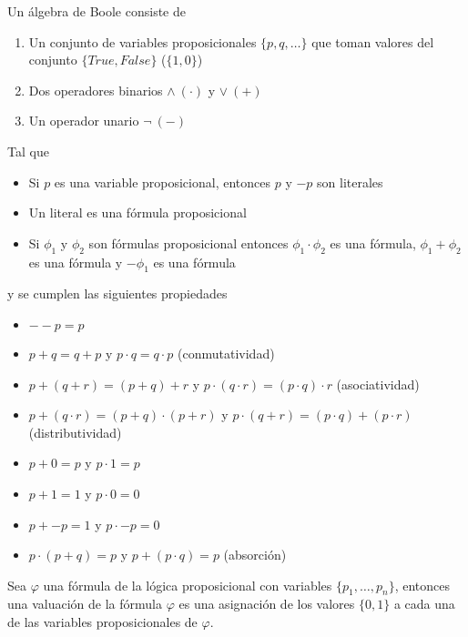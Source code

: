 \begin{definition}
 Un álgebra de Boole consiste de 
	\begin{enumerate}
		\item Un conjunto de variables proposicionales $\{p, q, \ldots\}$ que toman valores del conjunto $\{True, False\}$ ($\{1, 0\}$)
		\item Dos operadores binarios $\wedge\ (\cdot)$  y $\vee\ (+)$
		\item Un operador unario $\neg\ (-)$
	\end{enumerate}
	Tal que 
	\begin{itemize}
		\item Si $p$ es una variable proposicional, entonces $p$ y $-p$ son literales
		\item Un literal es una fórmula proposicional
		\item Si $\phi_1$ y $\phi_2$ son fórmulas proposicional entonces $\phi_1 \cdot \phi_2$ es una fórmula, $\phi_1 + \phi_2$ es una fórmula y $-\phi_1$ es una fórmula
	\end{itemize}
	y se cumplen las siguientes propiedades
	\begin{itemize}
		\item $--p = p$
		\item $p + q = q + p$ y $p \cdot q = q \cdot p$ (conmutatividad)
		\item $p + (q + r) = (p + q) + r$ y $p \cdot (q \cdot r) = (p \cdot q) \cdot r$ (asociatividad)
		\item $p + (q \cdot r) = (p + q) \cdot (p + r)$ y $p \cdot (q + r) = (p \cdot q) + (p \cdot r)$ (distributividad)
		\item $p + 0 = p$ y $p \cdot 1 = p$ 
		\item $p + 1 = 1$ y $p \cdot 0 = 0$
		\item $p + -p = 1$ y $p \cdot -p = 0$
		\item $p \cdot (p + q) = p$ y $p + (p \cdot q) = p$ (absorción)
	\end{itemize}
\end{definition}

\begin{definition}
 Sea $\varphi$ una fórmula de la lógica proposicional con variables $\{p_1, \ldots, p_n\}$, entonces una valuación de la fórmula $\varphi$ es una asignación de los valores $\{0, 1\}$ a cada una de las variables proposicionales de $\varphi$.
\end{definition}

